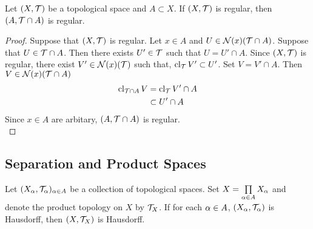 \documentclass{book}
\begin{document}
	\begin{ex}
		Let $(X, \mathcal{T})$ be a topological space and $A \subset X$. If $(X, \mathcal{T})$ is regular, then $(A, \mathcal{T} \cap A)$ is regular.
	\end{ex}
	
	\begin{proof}
		Suppose that $(X, \mathcal{T})$ is regular. Let $x \in A$ and $U \in \mathcal{N}(x)(\mathcal{T} \cap A)$. Suppose that $U \in \mathcal{T} \cap A$. Then there exists $U' \in \mathcal{T}$ such that $U = U' \cap A$. Since $(X, \mathcal{T})$ is regular, there exist $V' \in \mathcal{N}(x)(\mathcal{T})$ such that, $\operatorname{cl}_{\mathcal{T}} V' \subset U'$. Set $V = V' \cap A$. Then $V \in \mathcal{N}(x)(\mathcal{T} \cap A)$   
		\begin{align*}
			\operatorname{cl}_{\mathcal{T} \cap A} V
			& = \operatorname{cl}_{\mathcal{T}} V' \cap A \\
			& \subset U' \cap A
		\end{align*}
		Since $x \in A$ are arbitary, $(A, \mathcal{T} \cap A)$ is regular. \\
	\end{proof}































	\subsection{Separation and Product Spaces}
	
	\begin{ex}
		Let $(X_{\alpha}, \mathcal{T}_{\alpha})_{\alpha \in A}$ be a collection of topological spaces. Set $X = \prod\limits_{\alpha \in A} X_{\alpha}$ and denote the product topology on $X$ by $\mathcal{T}_X$. If for each $\alpha \in A$, $(X_{\alpha}, \mathcal{T}_{\alpha})$ is Hausdorff, then $(X, \mathcal{T}_X)$ is Hausdorff.
	\end{ex}
	
\end{document}
